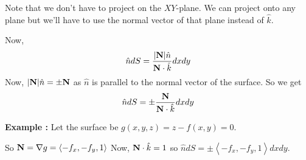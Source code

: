 Note that we don't have to project on the $XY$-plane. We can project onto any plane but we'll have to use the normal vector of that plane instead of $\hat{k}$.

Now, $$ \hat{n} dS = \frac{ |{\bf N}| \hat{n} }{ {\bf N} \cdot \hat{k} } dx dy $$
Now, $|{\bf N}|\hat{n} = \pm {\bf N}$ as $\hat{n}$ is parallel to the normal vector of the surface.
So we get $$\hat{n}dS = \pm \frac{ {\bf N} }{ {\bf N} \cdot \hat{k} } dx dy $$

{\bf Example : } Let the surface be $g(x, y, z) = z - f(x, y) = 0$.

So ${\bf N} = \nabla g = \left< - f_x, - f_y, 1 \right>$
Now, ${\bf N} \cdot \hat{k} = 1$ so $ \hat{n} dS = \pm \left< - f_x, - f_y, 1 \right> dx dy$.

